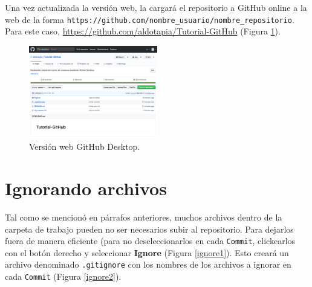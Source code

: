 \documentclass[10pt]{article}
\begin{document}
Una vez actualizada la versión web, la cargará el repositorio a GitHub online a la web de la forma \verb+https://github.com/nombre_usuario/nombre_repositorio+. Para este caso, \url{https://github.com/aldotapia/Tutorial-GitHub} (Figura \ref{web2}).\\

\begin{figure}[!h]
  \centering
    \includegraphics[width=0.5\textwidth]{Figuras/web2.png}
  \caption{Versión web GitHub Desktop.}
  \label{web2}
\end{figure}

\FloatBarrier

\section{Ignorando archivos}

Tal como se mencionó en párrafos anteriores, muchos archivos dentro de la carpeta de trabajo pueden no ser necesarios subir al repositorio. Para dejarlos fuera de manera eficiente (para no deseleccionarlos en cada \texttt{Commit}, clickearlos con el botón derecho y seleccionar \textbf{Ignore} (Figura \ref{ignore1}). Esto creará un archivo denominado \texttt{.gitignore} con los nombres de los archivos a ignorar en cada \texttt{Commit} (Figura \ref{ignore2}).\\
\end{document}
